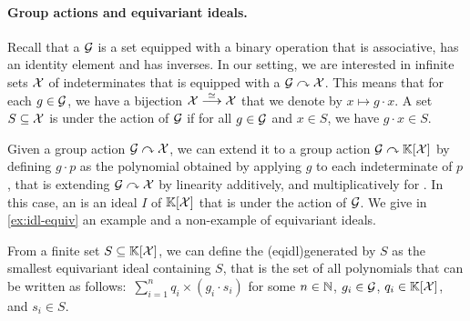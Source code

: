 \paragraph{Group actions and equivariant ideals.} Recall that a 
$\mathcal{G}$ is a set equipped with a binary operation that is associative, has an
identity element and has inverses. In our setting, we are interested in
infinite sets $\mathcal{X}$ of indeterminates that is equipped with a  $\mathcal{G} \curvearrowright \mathcal{X}$. This means that for each $g \in \mathcal{G}$,
we have a bijection $\mathcal{X} \stackrel{\simeq}{\longrightarrow} \mathcal{X}$ that we denote by $x \mapsto g \cdot x$. A
set $S \subseteq \mathcal{X}$ is  under the action of $\mathcal{G}$ if for
all $g \in \mathcal{G}$ and $x \in S$, we have $g \cdot x \in S$.

Given a group action $\mathcal{G} \curvearrowright \mathcal{X}$, we can extend it to a group
action $\mathcal{G} \curvearrowright \mathbb{K}[\mathcal{X}]$ by defining $g \cdot p$ as the
polynomial obtained by applying $g$ to each indeterminate of $p$, that is
extending $\mathcal{G} \curvearrowright \mathcal{X}$ by linearity additively, and
multiplicatively for . In this case, an 
is an ideal $I$ of $\mathbb{K}[\mathcal{X}]$ that is  under the action of
$\mathcal{G}$. We give in \cref{ex:idl-equiv} an example and a
non-example of equivariant ideals.

From a finite set $S \subseteq \mathbb{K}[\mathcal{X}]$, we can define the
 \kl(eqidl){generated by} $S$ as the smallest equivariant
ideal containing $S$, that is the set of all polynomials that can be written as
follows: $\,\sum_{i=1}^n q_i \times (g_i \cdot s_i)$ for some $n \in \mathbb{N}$, $g_i
\in \mathcal{G}$, $q_i \in \mathbb{K}[\mathcal{X}]$, and $s_i \in S$.



